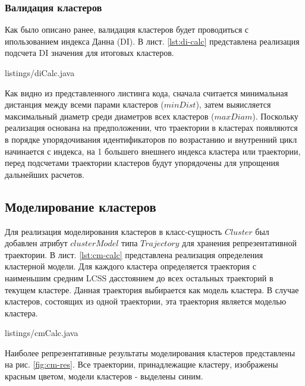 \subsubsection{Валидация кластеров}

Как было описано ранее, валидация кластеров будет проводиться с ипользованием индекса Данна (DI). В лист. \ref{lst:di-calc} представлена реализация подсчета DI значения для итоговых кластеров.

 {listings/diCalc.java}

Как видно из представленного листинга кода, сначала считается минимальная дистанция между всеми парами кластеров ($minDist$), затем выяисляется максимальный диаметр среди диаметров всех кластеров ($maxDiam$). Поскольку реализация основана на предположении, что траектории в кластерах появляются в порядке упорядочивания идентификаторов по возрастанию и внутренний цикл начинается с индекса, на 1 большего внешнего индекса кластера или траектории, перед подсчетами траектории кластеров будут упорядочены для упрощения дальнейших расчетов.

\subsection{Моделирование кластеров}

Для реализация моделирования кластеров в класс-сущность $Cluster$ был добавлен атрибут $clusterModel$ типа $Trajectory$ для хранения репрезентативной траектории. В лист. \ref{lst:cm-calc} представлена реализация определения кластерной модели. Для каждого кластера определяется траектория с наименьшим средним LCSS дасстоянием до всех остальных траекторий в текущем кластере. Данная траектория выбирается как модель кластера. В случае кластеров, состоящих из одной траектории, эта траектория является моделью кластера.

 {listings/cmCalc.java}

Наиболее репрезентативные результаты моделирования кластеров представлены на рис. \ref{fig:cm-res}. Все траектории, принадлежащие кластеру, изображены красным цветом, модели кластеров - выделены синим.

